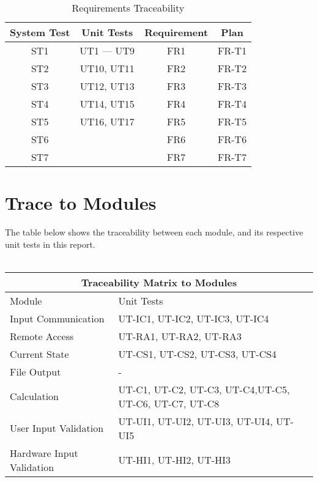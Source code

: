 \documentclass[12pt, titlepage]{article}
\begin{document}
\begin{table}[H]
	\centering
	\caption{Requirements Traceability}
	\label{my-label}
	\begin{tabular}{|c|c|c|c|}
		\hline
		\textbf{System Test} & \textbf{Unit Tests} & \textbf{Requirement} & \textbf{Plan} \\ \hline
		ST1 & UT1 — UT9 & FR1 &FR-T1 \\ \hline
		ST2 & UT10, UT11 & FR2 &FR-T2\\ \hline
		ST3 & UT12, UT13 & FR3 &FR-T3\\ \hline
		ST4 & UT14, UT15 & FR4 &FR-T4\\ \hline
		ST5 & UT16, UT17 & FR5 &FR-T5\\ \hline
		ST6 &  & FR6 &FR-T6\\ \hline
		ST7 &  & FR7 &FR-T7\\ \hline
	\end{tabular}
\end{table}
		
\pagebreak
\section{Trace to Modules}		
The table below shows the traceability between each module, and its respective unit tests in this report.\\
\\
\begin{tabular}{ |p{5cm}||p{5cm}| }
  \hline
  \multicolumn{2}{|c|}{Traceability Matrix to Modules} \\
  \hline
  Module & Unit Tests \\
  \hline
  Input Communication   & UT-IC1, UT-IC2, UT-IC3, UT-IC4  \\ \hline
  Remote Access   & UT-RA1, UT-RA2, UT-RA3   \\ \hline
  Current State   & UT-CS1, UT-CS2, UT-CS3, UT-CS4   \\ \hline
  File Output   & -  \\ \hline
  Calculation   & UT-C1, UT-C2, UT-C3, UT-C4,UT-C5, UT-C6, UT-C7, UT-C8   \\ \hline
  User Input Validation  & UT-UI1, UT-UI2, UT-UI3, UT-UI4, UT-UI5   \\ \hline
  Hardware Input Validation  & UT-HI1, UT-HI2, UT-HI3  \\ \hline
  
 \end{tabular}


% 
\end{document}
